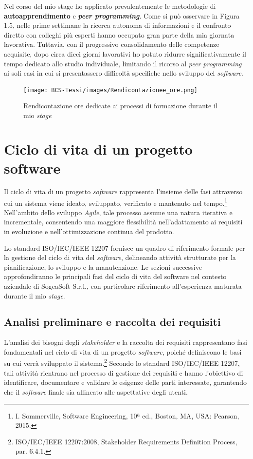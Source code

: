         \noindent Nel corso del mio stage ho applicato prevalentemente le metodologie di \textbf{autoapprendimento} e \textit{\textbf{peer programming}}. Come si può osservare in Figura 1.5, nelle prime settimane la ricerca autonoma di informazioni e il confronto diretto con colleghi più esperti hanno occupato gran parte della mia giornata lavorativa. Tuttavia, con il progressivo consolidamento delle competenze acquisite, dopo circa dieci giorni lavorativi ho potuto ridurre significativamente il tempo dedicato allo studio individuale, limitando il ricorso al \textit{peer programming} ai soli casi in cui si presentassero difficoltà specifiche nello sviluppo del \textit{software}.

        \begin{figure} [H]
            \centering
            \texttt{[image: BCS-Tessi/images/Rendicontazionee\_ore.png]}
            \caption{Rendicontazione ore dedicate ai processi di formazione durante il mio \textit{stage}}
            \label{fig:Ore-formazione}
        \end{figure}
        

    \section{Ciclo di vita di un progetto software}
    Il ciclo di vita di un progetto \textit{software} rappresenta l’insieme delle fasi attraverso cui un sistema viene ideato, sviluppato, verificato e mantenuto nel tempo.\footnote{I. Sommerville, Software Engineering, 10ª ed., Boston, MA, USA: Pearson, 2015.} Nell’ambito dello sviluppo \textit{Agile}, tale processo assume una natura iterativa e incrementale, consentendo una maggiore flessibilità nell’adattamento ai requisiti in evoluzione e nell’ottimizzazione continua del prodotto.
    
    \noindent Lo standard ISO/IEC/IEEE 12207 fornisce un quadro di riferimento formale per la gestione del ciclo di vita del \textit{software}, delineando attività strutturate per la pianificazione, lo sviluppo e la manutenzione. Le sezioni successive approfondiranno le principali fasi del ciclo di vita del software nel contesto aziendale di SogeaSoft S.r.l., con particolare riferimento all’esperienza maturata durante il mio \textit{stage}.
        \subsection{Analisi preliminare e raccolta dei requisiti}
        L’analisi dei bisogni degli \textit{stakeholder} e la raccolta dei requisiti rappresentano fasi fondamentali nel ciclo di vita di un progetto \textit{software}, poiché definiscono le basi su cui verrà sviluppato il sistema.\footnote{ISO/IEC/IEEE 12207:2008, Stakeholder Requirements Definition Process, par. 6.4.1.} Secondo lo standard ISO/IEC/IEEE 12207, tali attività rientrano nel processo di gestione dei requisiti e hanno l’obiettivo di identificare, documentare e validare le esigenze delle parti interessate, garantendo che il \textit{software} finale sia allineato alle aspettative degli utenti. 

